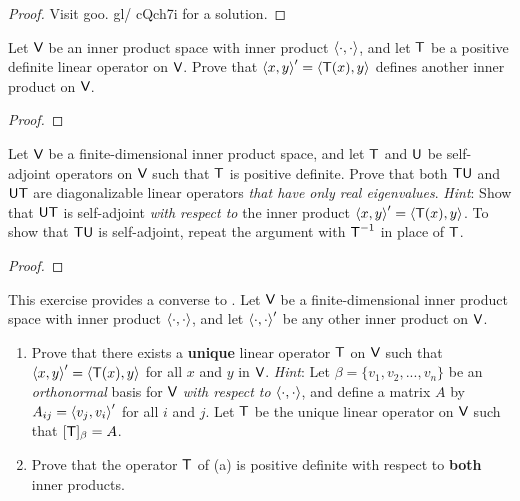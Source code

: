 \begin{proof}
Visit goo. gl/ cQch7i for a solution.
\end{proof}

\begin{exercise} \label{exercise 6.4.20}
Let \(\textsf{V}\) be an inner product space with inner product \(\left< \cdot, \cdot \right>\), and let \(\textsf{T}\) be a positive definite linear operator on \(\textsf{V}\).
Prove that \(\left< x, y \right>' = \left< \textsf{T}(x), y \right>\) defines another inner product on \(\textsf{V}\).
\end{exercise}

\begin{proof}
\end{proof}

\begin{exercise} \label{exercise 6.4.21}
Let \(\textsf{V}\) be a finite-dimensional inner product space, and let \(\textsf{T}\) and \(\textsf{U}\) be self-adjoint operators on \(\textsf{V}\) such that \(\textsf{T}\) is positive definite.
Prove that both \(\textsf{T}\textsf{U}\) and \(\textsf{U}\textsf{T}\) are diagonalizable linear operators \emph{that have only real eigenvalues}.
\emph{Hint}: Show that \(\textsf{U}\textsf{T}\) is self-adjoint \emph{with respect to} the inner product \(\left< x, y \right>' = \left< \textsf{T}(x), y \right>\).
To show that \(\textsf{T}\textsf{U}\) is self-adjoint, repeat the argument with \(\textsf{T}^{-1}\) in place of \(\textsf{T}\).
\end{exercise}

\begin{proof}
\end{proof}

\begin{exercise} \label{exercise 6.4.22}
This exercise provides a converse to .
Let \(\textsf{V}\) be a finite-dimensional inner product space with inner product \(\left< \cdot, \cdot \right>\), and let \(\left< \cdot, \cdot \right>'\) be any other inner product on \(\textsf{V}\).
\begin{enumerate}
\item Prove that there exists a \textbf{unique} linear operator \(\textsf{T}\) on \(\textsf{V}\) such that \(\left< x, y \right>' = \left< \textsf{T}(x), y \right>\) for all \(x\) and \(y\) in \(\textsf{V}\).
\emph{Hint}: Let \(\beta = \{ v_1, v_2, ..., v_n \}\) be an \emph{orthonormal} basis for \(\textsf{V}\) \emph{with respect to} \(\left< \cdot, \cdot \right>\), and define a matrix \(A\) by \(A_{ij} = \left< v_j, v_i \right>'\) for all \(i\) and \(j\).
Let \(\textsf{T}\) be the unique linear operator on \(\textsf{V}\) such that \([\textsf{T}]_{\beta} = A\).
\item Prove that the operator \(\textsf{T}\) of (a) is positive definite with respect to \textbf{both} inner products.
\end{enumerate}
\end{exercise}

